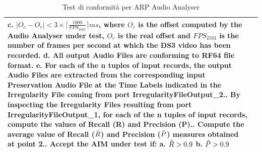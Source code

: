 \begin{table}[h]
\begin{tabular}{|p{}|p{}|}
            	   c.	$|O_c - O_r| < 3 \times \lceil\frac{1000}{FPS_{DS3}}\rceil ms$, where $O_c$ is the offset computed by the Audio Analyser under test, $O_r$ is the real offset and $FPS_{DS3}$ is the number of frames per second at which the DS3 video has been recorded.\newline
            	   d.	All output Audio Files are conforming to RF64 file format.\newline
            	   e.	For each of the n tuples of input records, the output Audio Files are extracted from the corresponding input Preservation Audio File at the Time Labels indicated in the Irregularity File coming from port IrregularityFileOutput\_2.\newline
            	2.	By inspecting the Irregularity Files resulting from port IrregularityFileOutput\_1, for each of the n tuples of input records, compute the values of Recall (R) and Precision (P).\newline
            	3.	Compute the average value of Recall ($\Tilde{R}$) and Precision ($\Tilde{P}$) measures obtained at point 2.\newline
            	4.	Accept the AIM under test if:\newline
                	a.	$\Tilde{R} > 0.9$\newline
                	b.	$\Tilde{P} > 0.9$\\
        \hline
    \end{tabular}
    \caption{Test di conformità per \ac{ARP} Audio Analyser}
    \label{tab:audioanalyser-valutazione}
\end{table}

